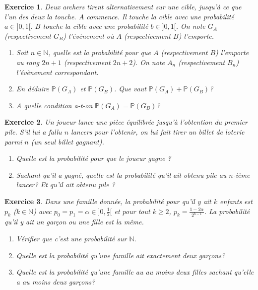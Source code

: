 \documentclass[12pt]{article}
\newtheorem{exercise}{Exercice}[section]
\theoremstyle{remark}
\theoremstyle{remark}
\newcommand{\N}{\mathbb{N}} \newcommand{\Z}{\mathbb{Z}}
\renewcommand{\P}{\mathbb{P}} \newcommand{\im}{\emph{Im}}
\begin{document}
\begin{exercise}
	Deux archers tirent alternativement sur une cible, jusqu'à ce que l'un des
	deux la touche. $A$ commence. Il touche la cible avec une probabilité
	$a\in]0,1[$. $B$ touche la cible avec une probabilité $b\in]0,1[$. On note
	$G_{A}$ (respectivement $G_{B}$) l'évènement où $A$ (respectivement $B$)
	l'emporte.
	\begin{enumerate}
		\item
		Soit $n\in\N$, quelle est la probabilité pour que $A$ (respectivement $B$)
		l'emporte au rang $2n+1$ (respectivement $2n+2$). On note $A_{n}$
		(respectivement $B_{n}$) l'évènement correspondant.
		\item
		En déduire $\P(G_{A})$ et $\P(G_{B})$. Que vaut $\P(G_{A})+\P(G_{B})$?
		\item A quelle condition a-t-on $\P(G_{A})=\P(G_{B})$?
	\end{enumerate}
\end{exercise}

\begin{exercise}
	Un joueur lance une pièce équilibrée jusqu'à l'obtention du premier pile. S'il
	lui a fallu $n$ lancers pour l'obtenir, on lui fait tirer un billet de loterie
	parmi $n$ (un seul billet gagnant).
	\begin{enumerate}
		\item
		Quelle est la probabilité pour que le joueur gagne ?
		\item
		Sachant qu'il a gagné, quelle est la probabilité qu'il ait obtenu pile au
		$n$-ième lancer? Et qu'il ait obtenu pile ?
	\end{enumerate}
\end{exercise}

\begin{exercise}
	Dans une famille donnée, la probabilité pour qu'il y ait $k$ enfants est
	$p_{k}$ ($k\in\N$) avec $p_{0}=p_{1}=\alpha\in]0,\frac{1}{2}[$ et pour tout
	$k\geqslant2$, $p_{k}=\frac{1-2\alpha}{2^{k-1}}$. La probabilité qu'il y ait
	un garçon ou une fille est la même.
	\begin{enumerate}
		\item
		Vérifier que c'est une probabilité sur $\N$.
		\item
		Quelle est la probabilité qu'une famille ait exactement deux garçons?
		\item
		Quelle est la probabilité qu'une famille au au moins deux filles sachant
		qu'elle a au moins deux garçons?
	\end{enumerate}
\end{exercise}
\end{document}
